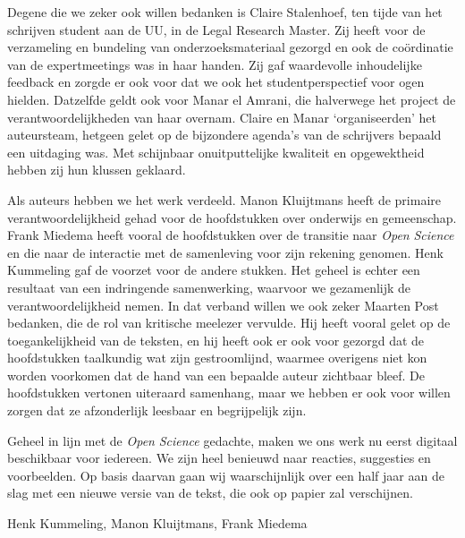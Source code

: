 \documentclass[smallauthor, chapterhaspagenum, nochapterinheader, pagenuminheader,  bigchapnum,medium2, tocpages,  garamond, titleinheader]{jote-book}
\begin{document}
	Degene die we zeker ook willen bedanken is Claire Stalenhoef, ten tijde van het schrijven student aan de UU, in de Legal Research Master. Zij heeft voor de verzameling en bundeling van onderzoeksmateriaal gezorgd en ook de coördinatie van de expertmeetings was in haar handen. Zij gaf waardevolle inhoudelijke feedback en zorgde er ook voor dat we ook het studentperspectief voor ogen hielden. Datzelfde geldt ook voor Manar el Amrani, die halverwege het project de verantwoordelijkheden van haar overnam. Claire en Manar ‘organiseerden' het auteursteam, hetgeen gelet op de bijzondere agenda's van de schrijvers bepaald een uitdaging was. Met schijnbaar onuitputtelijke kwaliteit en opgewektheid hebben zij hun klussen geklaard.



	Als auteurs hebben we het werk verdeeld. Manon Kluijtmans heeft de primaire verantwoordelijkheid gehad voor de hoofdstukken over onderwijs en gemeenschap. Frank Miedema heeft vooral de hoofdstukken over de transitie naar \emph{Open }\emph{Science} en die naar de interactie met de samenleving voor zijn rekening genomen. Henk Kummeling gaf de voorzet voor de andere stukken. Het geheel is echter een resultaat van een indringende samenwerking, waarvoor we gezamenlijk de verantwoordelijkheid nemen. In dat verband willen we ook zeker Maarten Post bedanken, die de rol van kritische meelezer vervulde. Hij heeft vooral gelet op de toegankelijkheid van de teksten, en hij heeft ook er ook voor gezorgd dat de hoofdstukken taalkundig wat zijn gestroomlijnd, waarmee overigens niet kon worden voorkomen dat de hand van een bepaalde auteur zichtbaar bleef. De hoofdstukken vertonen uiteraard samenhang, maar we hebben er ook voor willen zorgen dat ze afzonderlijk leesbaar en begrijpelijk zijn.



	Geheel in lijn met de \emph{Open }\emph{Science} gedachte, maken we ons werk nu eerst digitaal beschikbaar voor iedereen. We zijn heel benieuwd naar reacties, suggesties en voorbeelden. Op basis daarvan gaan wij waarschijnlijk over een half jaar aan de slag met een nieuwe versie van de tekst, die ook op papier zal verschijnen.



	\vspace*{\baselineskip}

	\noindent Henk Kummeling, Manon Kluijtmans, Frank Miedema

	\vspace*{\baselineskip}
\end{document}
